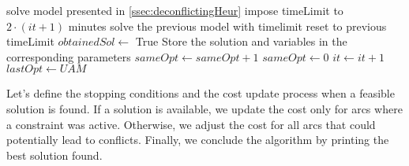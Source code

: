 \documentclass[../thesis.tex]{subfiles}
\begin{document}
\begin{algorithm}[H]
\begin{algorithmic}
    \STATE solve model presented in \ref{ssec:deconflictingHeur}
    \STATE impose timeLimit to $2\cdot (it+1)$ minutes
    \STATE solve the previous model with timelimit
    \STATE reset to previous timeLimit
    \ENDIF
    \STATE $obtainedSol\gets$ True
    \STATE Store the solution and variables in the corresponding parameters
    \ENDIF
    \ENDIF
    \STATE $sameOpt\gets sameOpt+1$
    \ELSE
    \STATE $sameOpt\gets0$
    \ENDIF
    \STATE $it\gets it+1$
    \STATE $lastOpt\gets UAM$
\end{algorithmic}
\end{algorithm}
Let’s define the stopping conditions and the cost update process when a feasible solution is found.
If a solution is available, we update the cost only for arcs where a constraint was active. Otherwise, we adjust the cost for all arcs that could potentially lead to conflicts.
Finally, we conclude the algorithm by printing the best solution found.
\end{document}
